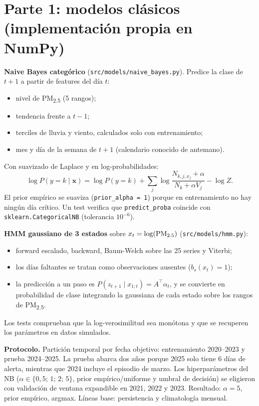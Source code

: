 \documentclass[10pt,a4paper]{article}
\newcommand{\code}[1]{\texttt{\small #1}}
\newcommand{\pmd}{PM\textsubscript{2.5}}
\begin{document}
\section{Parte 1: modelos clásicos (implementación propia en NumPy)}
\textbf{Naive Bayes categórico} (\code{src/models/naive\_bayes.py}). Predice la clase de $t+1$ a partir
de features del día $t$:
\begin{itemize}
  \item nivel de \pmd{} (5 rangos);
  \item tendencia frente a $t-1$;
  \item terciles de lluvia y viento, calculados solo con entrenamiento;
  \item mes y día de la semana de $t+1$ (calendario conocido de antemano).
\end{itemize}
Con suavizado de Laplace y en log-probabilidades:
\begin{equation*}
  \log P(y{=}k \mid \mathbf{x}) = \log P(y{=}k) + \sum_j \log \frac{N_{k,j,x_j} + \alpha}{N_k + \alpha V_j} - \log Z .
\end{equation*}
El prior empírico se suaviza (\code{prior\_alpha = 1}) porque en entrenamiento no hay ningún día
crítico. Un test verifica que \code{predict\_proba} coincide con \code{sklearn.CategoricalNB}
(tolerancia $10^{-6}$).

\textbf{HMM gaussiano de 3 estados} sobre $x_t = \log(\text{\pmd})$ (\code{src/models/hmm.py}):
\begin{itemize}
  \item forward escalado, backward, Baum-Welch sobre las 25 series y Viterbi;
  \item los días faltantes se tratan como observaciones ausentes ($b_s(x_t)=1$);
  \item la predicción a un paso es $P(z_{t+1}\mid x_{1:t}) = A^{\top}\alpha_t$, y se convierte en
    probabilidad de clase integrando la gaussiana de cada estado sobre los rangos de \pmd.
\end{itemize}
Los tests comprueban que la log-verosimilitud sea monótona y que se recuperen los parámetros en datos simulados.

\textbf{Protocolo.} Partición temporal por fecha objetivo: entrenamiento 2020--2023 y prueba 2024--2025.
La prueba abarca dos años porque 2025 solo tiene 6 días de alerta, mientras que 2024 incluye el
episodio de marzo. Los hiperparámetros del NB ($\alpha \in \{0{,}5;\,1;\,2;\,5\}$, prior empírico/uniforme
y umbral de decisión) se eligieron con validación de ventana expandible en 2021, 2022 y 2023. Resultado:
$\alpha = 5$, prior empírico, argmax. Líneas base: persistencia y climatología mensual.
\end{document}
